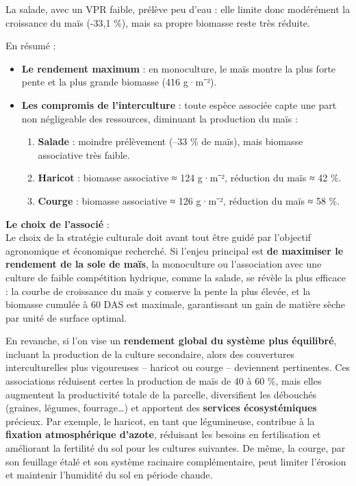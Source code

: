 \documentclass[
]{article}
\begin{document}
La salade, avec un VPR faible, prélève peu d'eau : elle limite donc
modérément la croissance du maïs (-33,1 \%), mais sa propre biomasse
reste très réduite.

En résumé :

\begin{itemize}
\item
  \textbf{Le rendement maximum} : en monoculture, le maïs montre la plus
  forte pente et la plus grande biomasse (416 g·m⁻²).
\item
  \textbf{Les compromis de l'interculture} : toute espèce associée capte
  une part non négligeable des ressources, diminuant la production du
  maïs :

  \begin{enumerate}
  \def\labelenumi{\arabic{enumi}.}
  \item
    \textbf{Salade} : moindre prélèvement (--33 \% de maïs), mais
    biomasse associative très faible.
  \item
    \textbf{Haricot} : biomasse associative ≈ 124 g·m⁻², réduction du
    maïs ≈ 42 \%.
  \item
    \textbf{Courge} : biomasse associative ≈ 126 g·m⁻², réduction du
    maïs ≈ 58 \%.
  \end{enumerate}
\end{itemize}

\textbf{Le choix de l'associé} :\\
Le choix de la stratégie culturale doit avant tout être guidé par
l'objectif agronomique et économique recherché. Si l'enjeu principal est
\textbf{de maximiser le rendement de la sole de maïs}, la monoculture ou
l'association avec une culture de faible compétition hydrique, comme la
salade, se révèle la plus efficace : la courbe de croissance du maïs y
conserve la pente la plus élevée, et la biomasse cumulée à 60 DAS est
maximale, garantissant un gain de matière sèche par unité de surface
optimal.

En revanche, si l'on vise un \textbf{rendement global du système plus
équilibré}, incluant la production de la culture secondaire, alors des
couvertures interculturelles plus vigoureuses -- haricot ou courge --
deviennent pertinentes. Ces associations réduisent certes la production
de maïs de 40 à 60 \%, mais elles augmentent la productivité totale de
la parcelle, diversifient les débouchés (graines, légumes,
fourrage\ldots) et apportent des \textbf{services écosystémiques}
précieux. Par exemple, le haricot, en tant que légumineuse, contribue à
la \textbf{fixation atmosphérique d'azote}, réduisant les besoins en
fertilisation et améliorant la fertilité du sol pour les cultures
suivantes. De même, la courge, par son feuillage étalé et son système
racinaire complémentaire, peut limiter l'érosion et maintenir l'humidité
du sol en période chaude.
\end{document}
